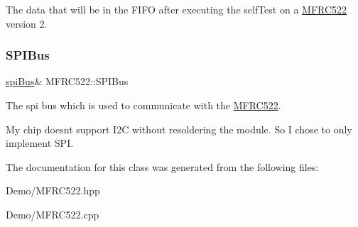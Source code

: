 The data that will be in the F\+I\+FO after executing the self\+Test on a \mbox{\hyperlink{class_m_f_r_c522}{M\+F\+R\+C522}} version 2. 

\mbox{\label{class_m_f_r_c522_a76b0186fcad01aafd3d7d7ae4da6a68c}} 
\subsubsection{\texorpdfstring{S\+P\+I\+Bus}{SPIBus}}
{\footnotesize\ttfamily \mbox{\hyperlink{classspi_bus}{spi\+Bus}}\& M\+F\+R\+C522\+::\+S\+P\+I\+Bus\hspace{0.3cm}{\ttfamily [private]}}



The spi bus which is used to communicate with the \mbox{\hyperlink{class_m_f_r_c522}{M\+F\+R\+C522}}. 

My chip doesn\textquotesingle{}t support I2C without resoldering the module. So I chose to only implement S\+PI. 

The documentation for this class was generated from the following files\+:\begin{DoxyCompactItemize}
\item 
Demo/M\+F\+R\+C522.\+hpp\item 
Demo/M\+F\+R\+C522.\+cpp\end{DoxyCompactItemize}
